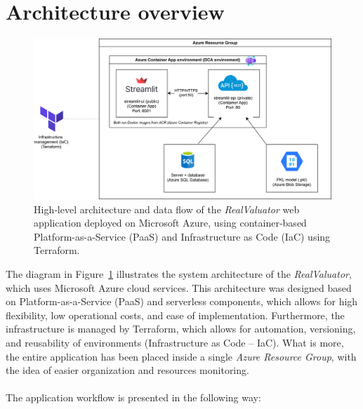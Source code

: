 \documentclass{article}
\begin{document}
\section{Architecture overview}

    \begin{figure}[h!]
    \centering
    \includegraphics[width=14cm,keepaspectratio]{architecture.png}
    \caption{High‑level architecture and data flow of the \textit{RealValuator} web application deployed on Microsoft Azure, using container‑based Platform-as-a-Service  (PaaS) and Infrastructure as Code (IaC) using Terraform.}
    \label{fig:arch}
\end{figure}


The diagram in Figure~\ref{fig:arch} illustrates the system architecture of the \textit{RealValuator}, which uses Microsoft Azure cloud services. This architecture was designed based on Platform-as-a-Service (PaaS) and serverless components, which allows for high flexibility, low operational costs, and ease of implementation. Furthermore, the infrastructure is managed by Terraform, which allows for automation, versioning, and reusability of environments (Infrastructure as Code – IaC). What is more, the entire application has been placed inside a single \emph{Azure Resource Group}, with the idea of easier organization and resources monitoring.

\paragraph{}
The application workflow is presented in the following way:
\end{document}
